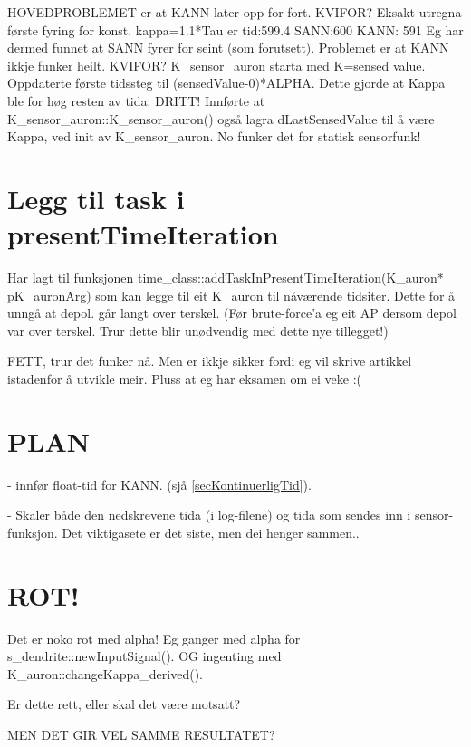 	HOVEDPROBLEMET er at KANN later opp for fort. KVIFOR? Eksakt utregna første fyring for konst. kappa=1.1*Tau er tid:599.4  
	SANN:600 	KANN: 591
	Eg har dermed funnet at SANN fyrer for seint (som forutsett). Problemet er at KANN ikkje funker heilt. KVIFOR?
	K\_sensor\_auron starta med K=sensed value. Oppdaterte første tidssteg til (sensedValue-0)*ALPHA. Dette gjorde at Kappa ble for høg resten av tida. DRITT!
	Innførte at K\_sensor\_auron::K\_sensor\_auron() også lagra dLastSensedValue til å være Kappa, ved init av K\_sensor\_auron. No funker det for statisk sensorfunk!

\section{Legg til task i presentTimeIteration}
Har lagt til funksjonen time\_class::addTaskInPresentTimeIteration(K\_auron* pK\_auronArg) som kan legge til eit K\_auron til nåværende tidsiter.
Dette for å unngå at depol. går langt over terskel.
(Før brute-force'a eg eit AP dersom depol var over terskel. Trur dette blir unødvendig med dette nye tillegget!)

FETT, trur det funker nå. Men er ikkje sikker fordi eg vil skrive artikkel istadenfor å utvikle meir.
Pluss at eg har eksamen om ei veke :(



\section{PLAN}
	- innfør float-tid for KANN. (sjå \ref{secKontinuerligTid}).

	- Skaler både den nedskrevene tida (i log-filene) og tida som sendes inn i sensor-funksjon. Det viktigasete er det siste, men dei henger sammen..

\section{ROT!}
Det er noko rot med alpha! Eg ganger med alpha for s\_dendrite::newInputSignal(). OG ingenting med K\_auron::changeKappa\_derived().

Er dette rett, eller skal det være motsatt?

MEN DET GIR VEL SAMME RESULTATET?
